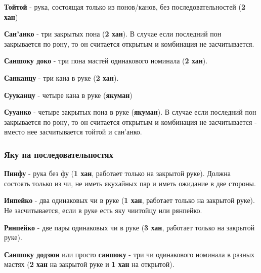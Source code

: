 \textbf{Тойтой} - рука, состоящая только из понов/канов, без последовательностей (\textbf{2 хан})

 \hfill {}

\textbf{Сан'анко} - три закрытых пона (\textbf{2 хан}). В случае если последний пон закрывается по рону, то он считается открытым и комбинация не засчитывается.

 \hfill {}

\textbf{Саншоку доко} - три пона мастей одинакового номинала (\textbf{2 хан}).

 \hfill {}

\textbf{Санканцу} - три кана в руке (\textbf{2 хан}).

 \hfill {}

\textbf{Сууканцу} - четыре кана в руке (\textbf{якуман})

 \hfill {}

\textbf{Сууанко} - четыре закрытых пона в руке (\textbf{якуман}). В случае если последний пон закрывается по рону, то он считается открытым и комбинация не засчитывается - вместо нее засчитывается тойтой и сан'анко.


\subsubsection{Яку на последовательностях}

\textbf{Пинфу} - рука без фу (\textbf{1 хан}, работает только на закрытой руке). Должна состоять только из чи, не иметь якухайных пар и иметь ожидание в две стороны.


\textbf{Иипейко} - два одинаковых чи в руке (\textbf{1 хан}, работает только на закрытой руке). Не засчитывается, если в руке есть яку чиитойцу или рянпейко.


\textbf{Рянпейко} - две пары одинаковых чи в руке (\textbf{3 хан}, работает только на закрытой руке).


\textbf{Саншоку додзюн} или просто \textbf{саншоку} - три чи одинакового номинала в разных мастях (\textbf{2 хан} на закрытой руке и \textbf{1 хан} на открытой).

